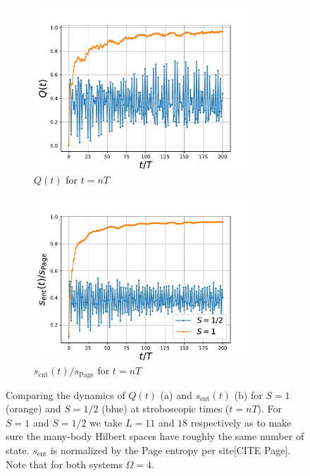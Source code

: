 \documentclass{SciPost}
\newcommand\0{\scalebox{-1}[1]{0}}
\begin{document}
\begin{figure}
	\begin{subfigure}[a]{0.496\textwidth}
		\includegraphics[width=0.9\textwidth]{TFIM_Q.pdf}
		\caption{$Q(t)$ for $t=nT$}
	\end{subfigure}
	\begin{subfigure}[b]{0.496\textwidth}
		\includegraphics[width=0.9\textwidth]{TFIM_S.pdf}
		\caption{$s_\mathrm{ent}(t)/s_\mathrm{Page}$ for $t=nT$}
	\end{subfigure}
	\caption{Comparing the dynamics of $Q(t)$ (a) and $s_\mathrm{ent}(t)$ (b) for $S=1$ (orange) and $S=1/2$ (blue) at stroboscopic times ($t=nT$). For $S=1$ and $S=1/2$ we take $L=11$ and $18$ respectively as to make sure the many-body Hilbert spaces have roughly the same number of state. $s_\mathrm{ent}$ is normalized by the Page entropy per site[CITE Page]. Note that for both systems $\Omega=4$.}
\end{figure}
\end{document}
